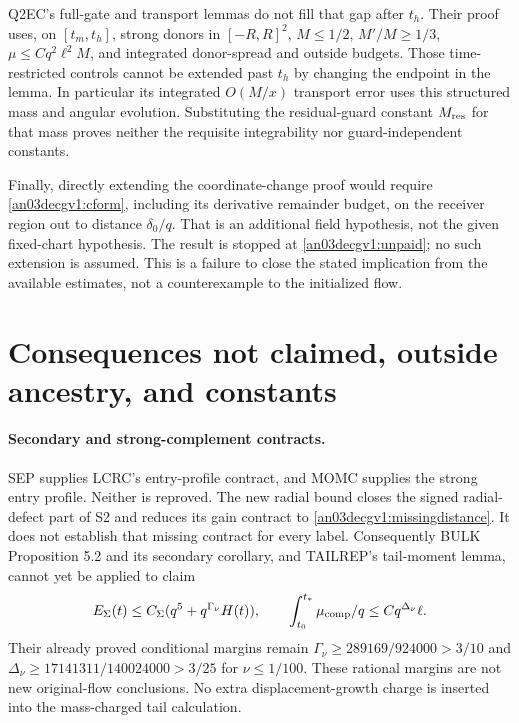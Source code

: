 \documentclass[11pt]{article}
\theoremstyle{remark}\newtheorem{remark}[proposition]{Remark}
\begin{document}
Q2EC's full-gate and transport lemmas do not fill that gap after
$t_h$. Their proof uses, on $[t_m,t_h]$, strong donors in
$[-R,R]^2$, $M\le1/2$, $M'/M\ge1/3$,
$\mu\le Cq^2\ell^2M$, and integrated donor-spread and outside
budgets. Those time-restricted controls cannot be extended past
$t_h$ by changing the endpoint in the lemma. In particular its
integrated $O(M/x)$ transport error uses this structured mass
and angular evolution. Substituting the residual-guard constant
$M_{\rm res}$ for that mass proves neither the requisite
integrability nor guard-independent constants.

Finally, directly extending the coordinate-change proof would
require \eqref{an03decgv1:cform}, including its derivative
remainder budget, on the receiver region out to distance
$\delta_0/q$. That is an additional field hypothesis, not the
given fixed-chart hypothesis. The result is stopped at
\eqref{an03decgv1:unpaid}; no such extension is assumed.
This is a failure to close the stated implication from the
available estimates, not a counterexample to the initialized flow.

\section{Consequences not claimed, outside ancestry, and constants}
\paragraph{Secondary and strong-complement contracts.}
SEP supplies LCRC's entry-profile contract, and MOMC supplies
the strong entry profile. Neither is reproved. The new radial
bound closes the signed radial-defect part of S2 and reduces its
gain contract to \eqref{an03decgv1:missingdistance}.
It does not establish that missing contract for every label.
Consequently BULK Proposition 5.2 and its secondary corollary,
and TAILREP's tail-moment lemma, cannot yet be applied to claim
\[
 E_\Sigma(t)\le C_\Sigma(q^5+q^{\Gamma_\nu}H(t)),\qquad
 \int_{t_0}^{t_*}\mu_{\rm comp}/q\le Cq^{\Delta_\nu}\ell.
\]
Their already proved conditional margins remain
$\Gamma_\nu\ge289169/924000>3/10$ and
$\Delta_\nu\ge17141311/140024000>3/25$ for $\nu\le1/100$.
These rational margins are not new original-flow conclusions.
No extra displacement-growth charge is inserted into the
mass-charged tail calculation.
\end{document}
